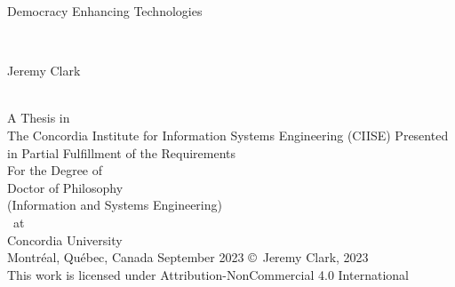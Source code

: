 
\thispagestyle{empty} %

\begin{center} 
\begin{Large} Democracy Enhancing Technologies \end{Large}\\[3em]
\begin{large} Jeremy Clark \end{large}\\
\vfill
A Thesis in\\
The Concordia Institute for Information Systems Engineering (CIISE)
\vfill
Presented in Partial Fulfillment of the Requirements\\
For the Degree of\\
Doctor of Philosophy\\ 
(Information and Systems Engineering)\\~at\\
Concordia University\\
Montr\'{e}al, Qu\'{e}bec, Canada
\vfill
September 2023
\vfill
\copyright~Jeremy Clark, 2023\\
This work is licensed under Attribution-NonCommercial 4.0 International
\end{center}

